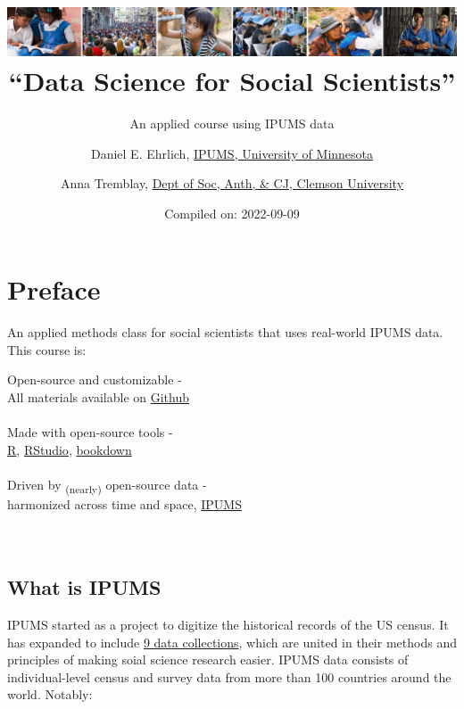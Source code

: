 \documentclass[
]{book}
\title{\includegraphics{ipums_banner.png}\\
``Data Science for Social Scientists''}
\subtitle{An applied course using IPUMS data}
\author{Daniel E. Ehrlich, \href{https://international.ipums.org/international/}{IPUMS, University of Minnesota} \and Anna Tremblay, \href{https://www.clemson.edu/cbshs/departments/sacj/degrees/anthropology.html}{Dept of Soc, Anth, \& CJ, Clemson University}}
\date{Compiled on: 2022-09-09}
\begin{document}
\maketitle

{
\setcounter{tocdepth}{1}
\tableofcontents
}
\hypertarget{preface}{%
\chapter*{Preface}\label{preface}}

An applied methods class for social scientists that uses real-world IPUMS data. This course is:

Open-source and customizable -\\
\hspace*{0.333em}\hspace*{0.333em}\hspace*{0.333em}All materials available on \href{https://github.com/ehrlichd/stats_book}{Github}\\
~\\
Made with open-source tools -\\
\hspace*{0.333em}\hspace*{0.333em}\href{https://cran.r-project.org/}{R}, \href{https://www.rstudio.com/products/rstudio/}{RStudio}, \href{https://bookdown.org/}{bookdown}\\
~\\
Driven by \textsubscript{(nearly)} open-source data -\\
\hspace*{0.333em}\hspace*{0.333em}harmonized across time and space, \href{https://ipums.org}{IPUMS}\\
~\\
~\\

\hypertarget{what-is-ipums}{%
\section*{What is IPUMS}\label{what-is-ipums}}

IPUMS started as a project to digitize the historical records of the US census. It has expanded to include \href{https://www.ipums.org/}{9 data collections}, which are united in their methods and principles of making soial science research easier. IPUMS data consists of individual-level census and survey data from more than 100 countries around the world. Notably:
\end{document}
